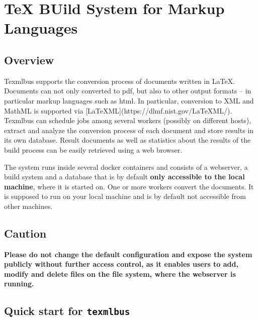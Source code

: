 \documentclass[a4paper]{article}
\title{\vtitle}
\author{Heinrich Stamerjohanns}
\date{2020-05-17}
\newcommand{\texmlbus}{\texttt{texmlbus}}
\newcommand{\latex}{\LaTeX{}}
\begin{document}
\maketitle

\section{TeX BUild System for Markup Languages}

\subsection{Overview}
Texmlbus supports the conversion process of documents written in \latex .
Documents can not only converted to pdf, but also to other output formats -- in particular markup languages such as html. In particular, conversion to XML and MathML is supported via [LaTeXML](https://dlmf.nist.gov/LaTeXML/). Texmlbus can schedule jobs among several workers (possibly on different hosts), extract and analyze the conversion process of each document and store results in its own database. Result documents as well as statistics about the results of the build process can be easily retrieved using a web browser.

 The system runs inside several docker containers and consists of a webserver, a build system and a database that is by default \textbf{only accessible to the local machine}, where it is started on. One or more workers convert the documents. It is supposed to run on your local machine and is by default not accessible from other machines.

\begin{shaded}
\subsection*{Caution}
\textbf{Please do not change the default configuration and expose the system publicly without further access control, as it enables users to add, modify and delete files on the file system, where the webserver is running.} 
\end{shaded}

\subsection{Quick start for \texmlbus}
\end{document}
